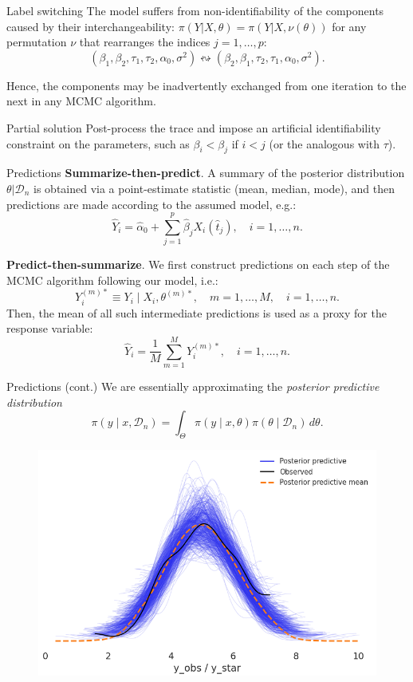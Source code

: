 \documentclass[9pt, english, professionalfonts]{beamer}
\begin{document}
\begin{frame}{Label switching}
The model suffers from non-identifiability of the components caused by their interchangeability: \(\pi(Y|X,\theta)=\pi(Y|X, \nu(\theta))\) for any permutation \(\nu\) that rearranges the indices \(j=1,\dots, p\):
    \[
    (\beta_1, \beta_2, \tau_1, \tau_2, \alpha_0, \sigma^2) \leftrightsquigarrow (\beta_2, \beta_1, \tau_2, \tau_1, \alpha_0, \sigma^2).
  \]

Hence, the components may be inadvertently exchanged from one iteration to the next in any MCMC algorithm.

\vspace{1em}
\begin{alertblock}{Partial solution}
  \vspace{0.25em}
  Post-process the trace and impose an artificial identifiability constraint on the parameters, such as \(\beta_i < \beta_j\) if \(i<j\) (or the analogous with \(\tau\)).
\end{alertblock}
\end{frame}

\begin{frame}{Predictions}
  \textbf{Summarize-then-predict}. A summary of the posterior distribution \(\theta| \mathcal D_n\) is obtained via a point-estimate statistic (mean, median, mode), and then predictions are made according to the assumed model, e.g.:
  \[
  \hat Y_i =\hat \alpha_0 + \sum_{j=1}^p \hat \beta_j X_i(\hat t_j), \quad i=1,\dots, n.
  \]

  \textbf{Predict-then-summarize}. We first construct predictions on each step of the MCMC algorithm following our model, i.e.:
  \[
    Y_i^{(m)*} \equiv Y_i \mid X_i, \theta^{(m)*}, \quad m=1,\dots,M, \quad i=1,\dots, n.
  \]
  Then, the mean of all such intermediate predictions is used as a proxy for the response variable:
  \[
    \hat Y_i = \frac{1}{M}\sum_{m=1}^M Y_i^{(m)*}, \quad i=1,\dots, n.
  \]
\end{frame}

\begin{frame}{Predictions (cont.)}
    We are essentially approximating the \textit{posterior predictive distribution}
\[
\pi(y\mid x, \mathcal D_n) = \int_{\Theta} \pi(y\mid x, \theta)\pi(\theta\mid \mathcal D_n)\, d\theta.
\]
  \begin{figure}
    \includegraphics[width=.675\textwidth]{ppc_linear}
  \end{figure}
\end{frame}
\end{document}
